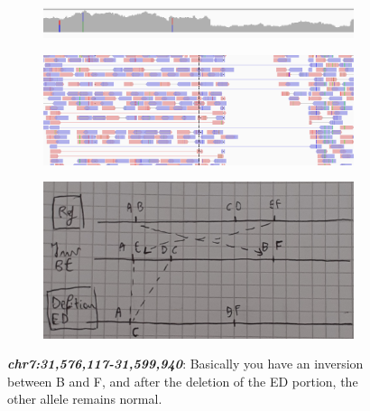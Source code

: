 \begin{figure}[H]
    \centering
    \begin{subfigure}[t]{0.8\textwidth}
        \centering
        \includegraphics[width=1\textwidth]{cov3.PNG}
    \end{subfigure}
    \begin{subfigure}[t]{0.8\textwidth}
        \centering
        \includegraphics[width=1\textwidth]{pos3.PNG}
    \end{subfigure}
    \hfill
    \begin{subfigure}[t]{0.8\textwidth}
        \centering
        \includegraphics[width=1\textwidth]{pos3passages.jpg}
    \end{subfigure}
    \caption{\textit{\textbf{chr7:31,576,117-31,599,940}}: Basically you have an
    inversion between B and F, and after the deletion of the ED portion, the
    other allele remains normal.}
    \label{fig:3}
\end{figure}


